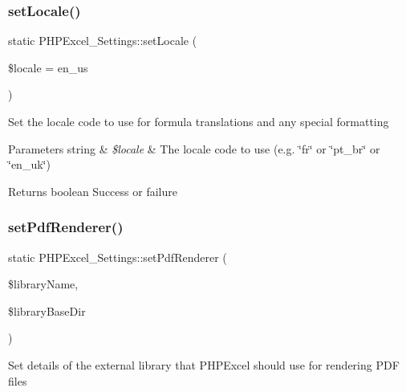 \subsubsection{\texorpdfstring{set\+Locale()}{setLocale()}}
{\footnotesize\ttfamily static P\+H\+P\+Excel\+\_\+\+Settings\+::set\+Locale (\begin{DoxyParamCaption}\item[{}]{\$locale = {\ttfamily \textquotesingle{}en\+\_\+us\textquotesingle{}} }\end{DoxyParamCaption})\hspace{0.3cm}{\ttfamily [static]}}

Set the locale code to use for formula translations and any special formatting


\begin{DoxyParams}[1]{Parameters}
string & {\em \$locale} & The locale code to use (e.\+g. \char`\"{}fr\char`\"{} or \char`\"{}pt\+\_\+br\char`\"{} or \char`\"{}en\+\_\+uk\char`\"{}) \\
\hline
\end{DoxyParams}
\begin{DoxyReturn}{Returns}
boolean Success or failure 
\end{DoxyReturn}
\mbox{\label{classPHPExcel__Settings_afe83e079e4fdb9f1e5de4f74ea0a7877}} 
\subsubsection{\texorpdfstring{set\+Pdf\+Renderer()}{setPdfRenderer()}}
{\footnotesize\ttfamily static P\+H\+P\+Excel\+\_\+\+Settings\+::set\+Pdf\+Renderer (\begin{DoxyParamCaption}\item[{}]{\$library\+Name,  }\item[{}]{\$library\+Base\+Dir }\end{DoxyParamCaption})\hspace{0.3cm}{\ttfamily [static]}}

Set details of the external library that P\+H\+P\+Excel should use for rendering P\+DF files


